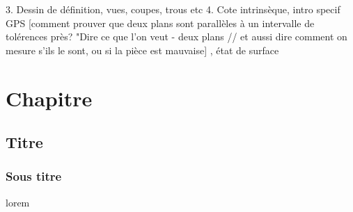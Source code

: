 \documentclass[
	11pt, %
	fleqn, %
	a4paper, %
]{LegrandOrangeBook}
\begin{document}
3. Dessin de définition, vues, coupes, trous etc
4. Cote intrinsèque, intro specif GPS [comment prouver que deux plans sont parallèles à un intervalle de tolérences près? "Dire ce que l'on veut - deux plans // et aussi dire comment on mesure s'ils le sont, ou si la pièce est mauvaise] , état de surface




\chapterspaceabove{6.25cm} %
\chapterspacebelow{7.5cm} %


\chapter{Chapitre}
\section{Titre}
\subsection{Sous titre}
\begin{definition}
lorem
\end{definition}




\chapterspaceabove{6.25cm} %
\chapterspacebelow{7.5cm} %



	
\end{document}
